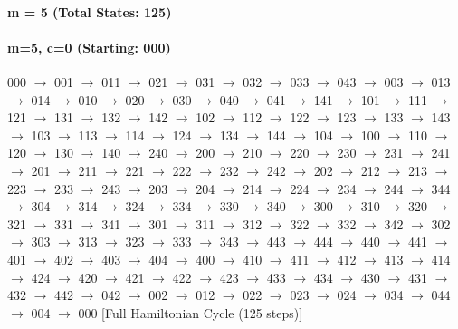 \paragraph{m = 5 (Total States: 125)}



\paragraph{ m=5, c=0 (Starting: 000)}



000 $\rightarrow$ 001 $\rightarrow$ 011 $\rightarrow$ 021 $\rightarrow$ 031 $\rightarrow$ 032 $\rightarrow$ 033 $\rightarrow$ 043 $\rightarrow$ 003 $\rightarrow$ 013 $\rightarrow$ 014 $\rightarrow$ 010 $\rightarrow$ 020 $\rightarrow$ 030 $\rightarrow$ 040 $\rightarrow$ 041 $\rightarrow$ 141 $\rightarrow$ 101 $\rightarrow$ 111 $\rightarrow$ 121 $\rightarrow$ 131 $\rightarrow$ 132 $\rightarrow$ 142 $\rightarrow$ 102 $\rightarrow$ 112 $\rightarrow$ 122 $\rightarrow$ 123 $\rightarrow$ 133 $\rightarrow$ 143 $\rightarrow$ 103 $\rightarrow$ 113 $\rightarrow$ 114 $\rightarrow$ 124 $\rightarrow$ 134 $\rightarrow$ 144 $\rightarrow$ 104 $\rightarrow$ 100 $\rightarrow$ 110 $\rightarrow$ 120 $\rightarrow$ 130 $\rightarrow$ 140 $\rightarrow$ 240 $\rightarrow$ 200 $\rightarrow$ 210 $\rightarrow$ 220 $\rightarrow$ 230 $\rightarrow$ 231 $\rightarrow$ 241 $\rightarrow$ 201 $\rightarrow$ 211 $\rightarrow$ 221 $\rightarrow$ 222 $\rightarrow$ 232 $\rightarrow$ 242 $\rightarrow$ 202 $\rightarrow$ 212 $\rightarrow$ 213 $\rightarrow$ 223 $\rightarrow$ 233 $\rightarrow$ 243 $\rightarrow$ 203 $\rightarrow$ 204 $\rightarrow$ 214 $\rightarrow$ 224 $\rightarrow$ 234 $\rightarrow$ 244 $\rightarrow$ 344 $\rightarrow$ 304 $\rightarrow$ 314 $\rightarrow$ 324 $\rightarrow$ 334 $\rightarrow$ 330 $\rightarrow$ 340 $\rightarrow$ 300 $\rightarrow$ 310 $\rightarrow$ 320 $\rightarrow$ 321 $\rightarrow$ 331 $\rightarrow$ 341 $\rightarrow$ 301 $\rightarrow$ 311 $\rightarrow$ 312 $\rightarrow$ 322 $\rightarrow$ 332 $\rightarrow$ 342 $\rightarrow$ 302 $\rightarrow$ 303 $\rightarrow$ 313 $\rightarrow$ 323 $\rightarrow$ 333 $\rightarrow$ 343 $\rightarrow$ 443 $\rightarrow$ 444 $\rightarrow$ 440 $\rightarrow$ 441 $\rightarrow$ 401 $\rightarrow$ 402 $\rightarrow$ 403 $\rightarrow$ 404 $\rightarrow$ 400 $\rightarrow$ 410 $\rightarrow$ 411 $\rightarrow$ 412 $\rightarrow$ 413 $\rightarrow$ 414 $\rightarrow$ 424 $\rightarrow$ 420 $\rightarrow$ 421 $\rightarrow$ 422 $\rightarrow$ 423 $\rightarrow$ 433 $\rightarrow$ 434 $\rightarrow$ 430 $\rightarrow$ 431 $\rightarrow$ 432 $\rightarrow$ 442 $\rightarrow$ 042 $\rightarrow$ 002 $\rightarrow$ 012 $\rightarrow$ 022 $\rightarrow$ 023 $\rightarrow$ 024 $\rightarrow$ 034 $\rightarrow$ 044 $\rightarrow$ 004 $\rightarrow$ 000 
[Full Hamiltonian Cycle (125 steps)]


